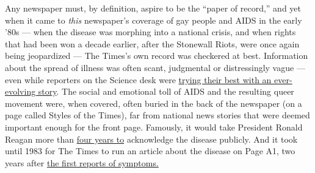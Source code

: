Any newspaper must, by definition, aspire to be the ``paper of record,''
and yet when it came to \emph{this} newspaper's coverage of gay people
and AIDS in the early '80s --- when the disease was morphing into a
national crisis, and when rights that had been won a decade earlier,
after the Stonewall Riots, were once again being jeopardized --- The
Times's own record was checkered at best. Information about the spread
of illness was often scant, judgmental or distressingly vague --- even
while reporters on the Science desk were
\href{https://www.nytimes3xbfgragh.onion/2018/04/13/t-magazine/nyt-writers-80s-coverage.html?rref=collection\%2Fsectioncollection\%2Ft-magazine\&action=click\&contentCollection=t-magazine\&region=stream\&module=stream_unit\&version=latest\&contentPlacement=18\&pgtype=sectionfront}{trying
their best with an ever-evolving story}. The social and emotional toll
of AIDS and the resulting queer movement were, when covered, often
buried in the back of the newspaper (on a page called Styles of the
Times), far from national news stories that were deemed important enough
for the front page. Famously, it would take President Ronald Reagan more
than
\href{https://www.nytimes3xbfgragh.onion/1987/10/11/opinion/the-reagan-aids-strategy-in-ruins.html}{four
years to} acknowledge the disease publicly. And it took until 1983 for
The Times to run an article about the disease on Page A1, two years
after
\href{https://www.nytimes3xbfgragh.onion/1981/07/03/us/rare-cancer-seen-in-41-homosexuals.html}{the
first reports of symptoms.}

